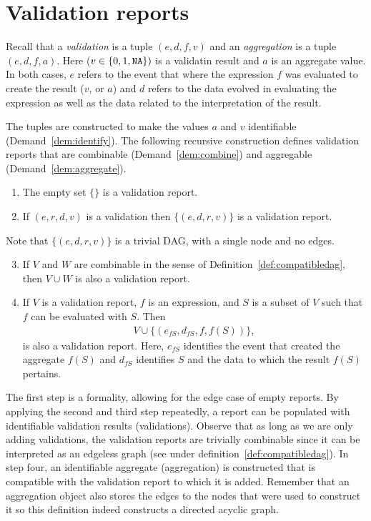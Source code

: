 \section{Validation reports}
\label{sect:basicreports}
Recall that a \emph{validation} is a tuple $(e,d,f,v)$ and an
\emph{aggregation} is a tuple $(e,d,f,a)$. Here ($v\in\{0,1,{\normalfont \texttt{NA}}{}\})$ is a
validatin result and $a$ is an aggregate value.  In both cases, $e$ refers to
the event that where the expression $f$ was evaluated to create the result
($v$, or $a$) and $d$ refers to the data evolved in evaluating the expression
as well as the data related to the interpretation of the result. 

The tuples are constructed to make  the values $a$ and $v$ identifiable
(Demand~\ref{dem:identify}).  The following recursive construction defines
validation reports that are combinable (Demand~\ref{dem:combine}) and
aggregable (Demand~\ref{dem:aggregate}).
%
\begin{definition}\leavevmode
\begin{enumerate}[topsep=0pt,itemsep=0pt]
\item The empty set $\{\}$ is a validation report.
\item If $(e,r,d,v)$ is a  validation then $\{(e,d,r,v)\}$ is a validation report.
\end{enumerate}
Note that $\{(e,d,r,v)\}$ is a trivial DAG, with a single node and no edges.
\begin{enumerate}
\setcounter{enumi}{2}
\item If $V$ and $W$ are combinable in the sense of
Definition~\ref{def:compatibledag}, then $V\cup W$ is also a validation report.
\item If $V$ is a validation report, $f$ is an expression, and  $S$ is a subset of $V$  
such that $f$ can be evaluated with $S$. Then 
\begin{align*}
V\cup \{(e_{fS}, d_{fS}, f, f(S))\},
\end{align*}
is also a validation report. Here, $e_{fS}$ identifies the event that created
the aggregate $f(S)$ and $d_{fS}$ identifies $S$ and the data to which the
result $f(S)$ pertains.
\end{enumerate}
\label{def:basicvalidationreport}
\end{definition}
%
The first step is a formality, allowing for the edge case of empty reports.  By
applying the second and third step repeatedly, a report can be populated with
identifiable validation results (validations). Observe that as long as we are
only adding validations, the validation reports are trivially combinable since
it can be interpreted as an edgeless graph (see under
definition~\ref{def:compatibledag}). In step four, an identifiable aggregate
(aggregation) is constructed that is compatible with the validation report to
which it is added. Remember that an aggregation object also stores the edges to
the nodes that were used to construct it so this definition indeed constructs a
directed acyclic graph.

